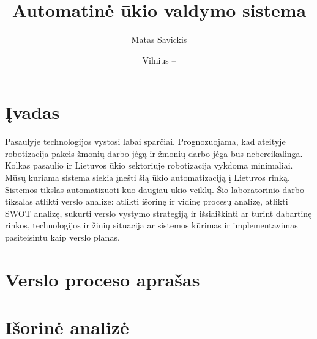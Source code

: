 \documentclass[oneside]{VUMIFPSkursinis}
\title{Automatinė ūkio valdymo sistema}
\author{Matas Savickis}
\date{Vilnius – \the\year}
\begin{document}
\maketitle
\centering
\tableofcontents


\section{Įvadas}
Pasaulyje technologijos vystosi labai sparčiai. Prognozuojama, kad ateityje robotizacija pakeis žmonių darbo jėgą ir žmonių darbo jėga bus nebereikalinga. Kolkas pasaulio ir Lietuvos ūkio sektoriuje robotizacija vykdoma minimaliai. Mūsų kuriama sistema siekia įnešti šią ūkio automatizaciją į Lietuvos rinką. Sistemos tikslas automatizuoti kuo daugiau ūkio veiklų. Šio laboratorinio darbo tiksalas atlikti verslo analize: atlikti išorinę ir vidinę procesų analizę, atlikti SWOT analizę, sukurti verslo vystymo strategiją ir išsiaiškinti ar turint dabartinę rinkos, technologijos ir žinių situacija ar sistemos kūrimas ir implementavimas pasiteisintu kaip verslo planas.
\section{Verslo proceso aprašas}

\section{Išorinė analizė}
\end{document}
